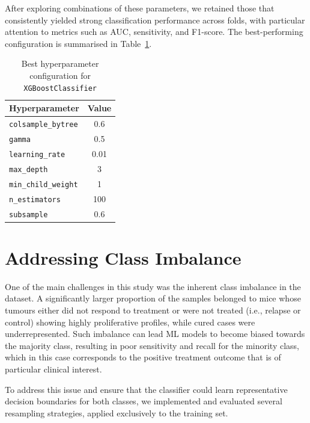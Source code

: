 \documentclass[12pt, a4paper]{report}
\begin{document}
After exploring combinations of these parameters, we retained those that consistently yielded strong classification performance across folds, with particular attention to metrics such as AUC, sensitivity, and F1-score. The best-performing configuration is summarised in Table~\ref{tab:best_params}.

\begin{table}[H]
\centering

\begin{tabular}{|l|c|}
\hline
\textbf{Hyperparameter} & \textbf{Value} \\
\hline
\texttt{colsample\_bytree} & 0.6 \\
\texttt{gamma} & 0.5 \\
\texttt{learning\_rate} & 0.01 \\
\texttt{max\_depth} & 3 \\
\texttt{min\_child\_weight} & 1 \\
\texttt{n\_estimators} & 100 \\
\texttt{subsample} & 0.6 \\
\hline
\end{tabular}
\caption{Best hyperparameter configuration for \texttt{XGBoostClassifier}}
\label{tab:best_params}
\end{table}


\section{Addressing Class Imbalance}

One of the main challenges in this study was the inherent class imbalance in the dataset. A significantly larger proportion of the samples belonged to mice whose tumours either did not respond to treatment or were not treated (i.e., relapse or control) showing highly proliferative profiles, while cured cases were underrepresented. Such imbalance can lead ML models to become biased towards the majority class, resulting in poor sensitivity and recall for the minority class, which in this case corresponds to the positive treatment outcome that is of particular clinical interest.

To address this issue and ensure that the classifier could learn representative decision boundaries for both classes, we implemented and evaluated several resampling strategies, applied exclusively to the training set.
\end{document}
